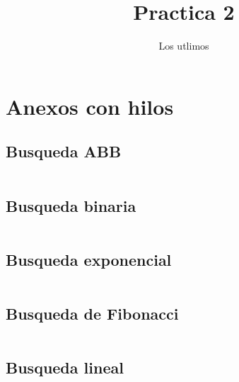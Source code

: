 \documentclass[12pt]{report}
\title{Practica 2}
\author{Los utlimos}
\begin{document}
\section*{Anexos con hilos}
\subsection*{Busqueda ABB}
\inputminted{C}{babinario.c}
\newpage
\subsection*{Busqueda binaria}
\inputminted{C}{bbinaria.c}
\newpage
\subsection*{Busqueda exponencial}
\inputminted{C}{bexponencial.c}
\newpage
\subsection*{Busqueda de Fibonacci}
\inputminted{C}{bfibonacci.c}
\newpage
\subsection*{Busqueda lineal}
\inputminted{C}{blineal.c}
\end{document}
